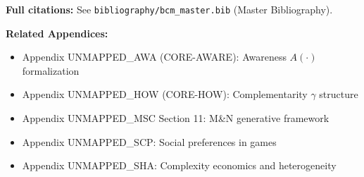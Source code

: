 \textbf{Full citations:} See \texttt{bibliography/bcm\_master.bib} (Master Bibliography).

\textbf{Related Appendices:}
\begin{itemize}[nosep]
    \item Appendix UNMAPPED_AWA (CORE-AWARE): Awareness $A(\cdot)$ formalization
    \item Appendix UNMAPPED_HOW (CORE-HOW): Complementarity $\gamma$ structure
    \item Appendix UNMAPPED_MSC Section 11: M\&N generative framework
    \item Appendix UNMAPPED_SCP: Social preferences in games
    \item Appendix UNMAPPED_SHA: Complexity economics and heterogeneity
\end{itemize}

